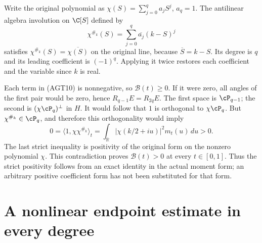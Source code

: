 Write the original polynomial as $\chi(S)=\sum_{j=0}^qa_jS^j$,
$a_q=1$. The antilinear algebra involution on $\C[S]$ defined by
\[
 \chi^{\#_k}(S)=\sum_{j=0}^q\overline{a_j}(k-S)^j
 \tag{AGT12}
\]
satisfies $\chi^{\#_k}(S)=\overline{\chi(S)}$ on the original
line, because $\overline S=k-S$. Its degree is $q$ and its
leading coefficient is $(-1)^q$. Applying it twice restores
each coefficient and the variable since $k$ is real.

Each term in (AGT10) is nonnegative, so $\mathcal B(t)\ge0$.
If it were zero, all angles of the first pair would be zero,
hence $R_{q-1}E=R_{2q}E$. The first space is $\cP_{q-1}$;
the second is $(\chi\cP_q)^\perp$ in $H$.
It would follow that $1$ is orthogonal to $\chi\cP_q$.
But $\chi^{\#_k}\in\cP_q$, and therefore this orthogonality
would imply
\[
 0=\langle1,\chi\chi^{\#_k}\rangle_t
   =\int_{\mathbb R}|\chi(k/2+iu)|^2m_t(u)\,du>0.
 \tag{AGT13}
\]
The last strict inequality is positivity of the original form
on the nonzero polynomial $\chi$. This contradiction proves
$\mathcal B(t)>0$ at every $t\in[0,1]$. Thus the strict
positivity follows from an exact identity in the actual
moment form; an arbitrary positive coefficient form has not
been substituted for that form.

\section{A nonlinear endpoint estimate in every degree}

